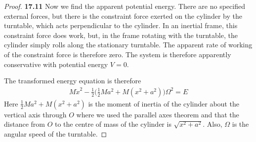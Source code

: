 \documentclass[11pt]{article}
\theoremstyle{definition}
\begin{document}
\begin{proof}{\textbf{17.11}}
    Now we find the apparent potential energy. There are no specified external
    forces, but there is the constraint force exerted on the cylinder by the
    turntable, which acts perpendicular to the cylinder.
    In an inertial frame, this constraint force does work, but, in the frame
    rotating with the turntable, the cylinder simply rolls along the stationary
    turntable. The apparent rate of working of the constraint force is therefore
    zero. The system is therefore apparently conservative with potential energy
    $V=0$.
    
    The transformed energy equation is therefore
    \begin{align*}
        M\dot x^2
        - \frac{1}{2}\bigg(\frac{1}{2}Ma^2 + M(x^2 + a^2)\bigg)\Omega^2 = E 
    \end{align*}
    Here $\frac{1}{2}Ma^2 + M(x^2 + a^2)$ is the moment of inertia
    of the cylinder about the vertical axis through $O$ where we used the
    parallel axes theorem and that the distance from $O$ to the centre of mass
    of the cylinder is $\sqrt{x^2 + a^2}$.
    Also, $\Omega$ is the angular speed of the turntable.


\end{proof}
\end{document}
